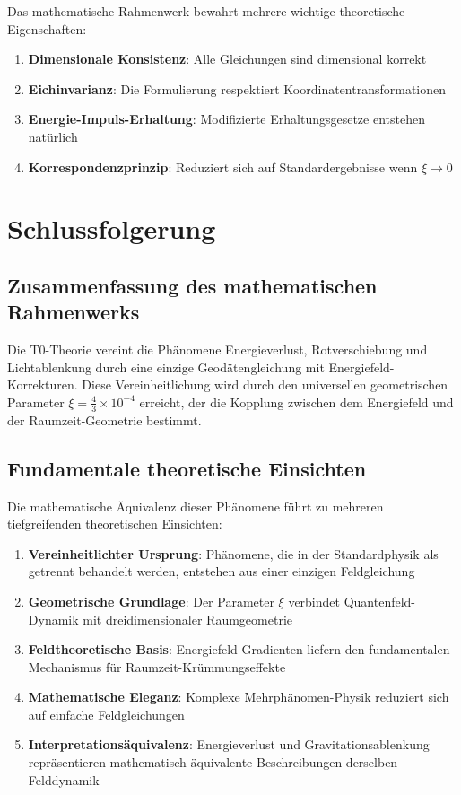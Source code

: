 \documentclass[12pt,a4paper]{article}
\theoremstyle{definition}
\begin{document}
	Das mathematische Rahmenwerk bewahrt mehrere wichtige theoretische Eigenschaften:
	
	\begin{enumerate}
		\item \textbf{Dimensionale Konsistenz}: Alle Gleichungen sind dimensional korrekt
		\item \textbf{Eichinvarianz}: Die Formulierung respektiert Koordinatentransformationen
		\item \textbf{Energie-Impuls-Erhaltung}: Modifizierte Erhaltungsgesetze entstehen nat\"urlich
		\item \textbf{Korrespondenzprinzip}: Reduziert sich auf Standardergebnisse wenn $\xi \rightarrow 0$
	\end{enumerate}
	
	\section{Schlussfolgerung}
	
	\subsection{Zusammenfassung des mathematischen Rahmenwerks}
	
	Die T0-Theorie vereint die Ph\"anomene Energieverlust, Rotverschiebung und Lichtablenkung durch eine einzige Geod\"atengleichung mit Energiefeld-Korrekturen. Diese Vereinheitlichung wird durch den universellen geometrischen Parameter $\xi = \frac{4}{3} \times 10^{-4}$ erreicht, der die Kopplung zwischen dem Energiefeld und der Raumzeit-Geometrie bestimmt.
	
	\subsection{Fundamentale theoretische Einsichten}
	
	Die mathematische \"Aquivalenz dieser Ph\"anomene f\"uhrt zu mehreren tiefgreifenden theoretischen Einsichten:
	
	\begin{enumerate}
		\item \textbf{Vereinheitlichter Ursprung}: Ph\"anomene, die in der Standardphysik als getrennt behandelt werden, entstehen aus einer einzigen Feldgleichung
		\item \textbf{Geometrische Grundlage}: Der Parameter $\xi$ verbindet Quantenfeld-Dynamik mit dreidimensionaler Raumgeometrie
		\item \textbf{Feldtheoretische Basis}: Energiefeld-Gradienten liefern den fundamentalen Mechanismus f\"ur Raumzeit-Kr\"ummungseffekte
		\item \textbf{Mathematische Eleganz}: Komplexe Mehrph\"anomen-Physik reduziert sich auf einfache Feldgleichungen
		\item \textbf{Interpretations\"aquivalenz}: Energieverlust und Gravitationsablenkung repr\"asentieren mathematisch \"aquivalente Beschreibungen derselben Felddynamik
	\end{enumerate}
	
\end{document}
